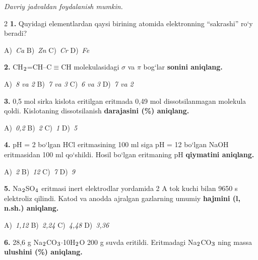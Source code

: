 \documentclass[11pt,a4paper]{article}
\renewcommand{\normalsize}{\fontsize{10.9}{13.4}\selectfont}
\renewcommand{\textsubscript}[1]{\ensuremath{_{\text{\fontsize{8}{8}\selectfont #1}}}}
\begin{document}
\normalsize
\thispagestyle{first}
\noindent{}
\par\medskip
\noindent\textit{Davriy jadvaldan foydalanish mumkin.}
\par\medskip
\begin{multicols}{2}
\noindent\textbf{1.} Quyidagi elementlardan qaysi birining atomida elektronning ``sakrashi'' ro`y beradi?

\noindent A)~\textsl{Ca} \hfill B)~\textsl{Zn} \hfill C)~\textsl{Cr} \hfill D)~\textsl{Fe}\par
\vspace{4pt}
\noindent\textbf{2.} CH\textsubscript{2}=CH--C$\equiv$CH molekulasidagi $\sigma$ va $\pi$ bog`lar \textbf{sonini aniqlang.}

\noindent A)~\textsl{8 va 2} \hfill B)~\textsl{7 va 3} \hfill C)~\textsl{6 va 3} \hfill D)~\textsl{7 va 2}\par
\vspace{4pt}
\noindent\textbf{3.} 0,5 mol sirka kislota eritilgan eritmada 0,49 mol dissotsilanmagan molekula qoldi. Kislotaning dissotsilanish \textbf{darajasini (\%) aniqlang.}

\noindent A)~\textsl{0,2} \hfill B)~\textsl{2} \hfill C)~\textsl{1} \hfill D)~\textsl{5}\par
\vspace{4pt}
\noindent\textbf{4.} pH = 2 bo`lgan HCl eritmasining 100 ml siga pH = 12 bo`lgan NaOH eritmasidan 100 ml qo`shildi. Hosil bo`lgan eritmaning pH \textbf{qiymatini aniqlang.}

\noindent A)~\textsl{2} \hfill B)~\textsl{12} \hfill C)~\textsl{7} \hfill D)~\textsl{9}\par
\vspace{4pt}
\noindent\textbf{5.} Na\textsubscript{2}SO\textsubscript{4} eritmasi inert elektrodlar yordamida 2 A tok kuchi bilan 9650 s elektroliz qilindi. Katod va anodda ajralgan gazlarning umumiy \textbf{hajmini (l, n.sh.) aniqlang.}

\noindent A)~\textsl{1,12} \hfill B)~\textsl{2,24} \hfill C)~\textsl{4,48} \hfill D)~\textsl{3,36}\par
\vspace{4pt}
\noindent\textbf{6.} 28,6 g Na\textsubscript{2}CO\textsubscript{3}$\cdot$10H\textsubscript{2}O 200 g suvda eritildi. Eritmadagi Na\textsubscript{2}CO\textsubscript{3} ning massa \textbf{ulushini (\%) aniqlang.}


\end{multicols}
\end{document}

